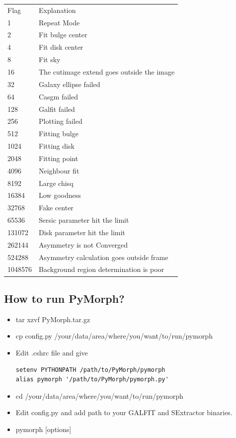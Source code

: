 \documentclass[a4paper,12pt]{article}
\begin{document}
\begin{center}
\begin{tabular}{ll}
Flag & Explanation \\ 
1 & Repeat Mode \\ 
2 & Fit bulge center \\ 
4 & Fit disk center \\ 
8 & Fit sky \\ 
16 & The cutimage extend goes outside the image \\ 
32 & Galaxy ellipse failed \\ 
64 & Casgm failed \\ 
128 & Galfit failed \\ 
256 & Plotting failed \\ 
512 & Fitting bulge \\ 
1024 & Fitting disk \\ 
2048 & Fitting point \\ 
4096 & Neighbour fit \\ 
8192 & Large chisq  \\ 
16384 & Low goodness \\ 
32768 & Fake center \\ 
65536 & Sersic parameter hit the limit \\ 
131072 & Disk parameter hit the limit \\
262144 & Asymmetry is not Converged \\
524288 & Asymmetry calculation goes outside frame \\
1048576 & Background region determination is poor \\
\end{tabular}
\end{center}

\subsection{How to run PyMorph?}
\begin{itemize}
\item tar xzvf PyMorph.tar.gz
\item cp config.py /your/data/area/where/you/want/to/run/pymorph
\item Edit .cshrc file and give
\begin{footnotesize}
\begin{verbatim}
setenv PYTHONPATH /path/to/PyMorph/pymorph
alias pymorph '/path/to/PyMorph/pymorph.py'
\end{verbatim}
\end{footnotesize}
\item cd /your/data/area/where/you/want/to/run/pymorph
\item Edit config.py and add path to your GALFIT and SExtractor binaries.
\item pymorph [options]
\end{itemize}
\end{document}
